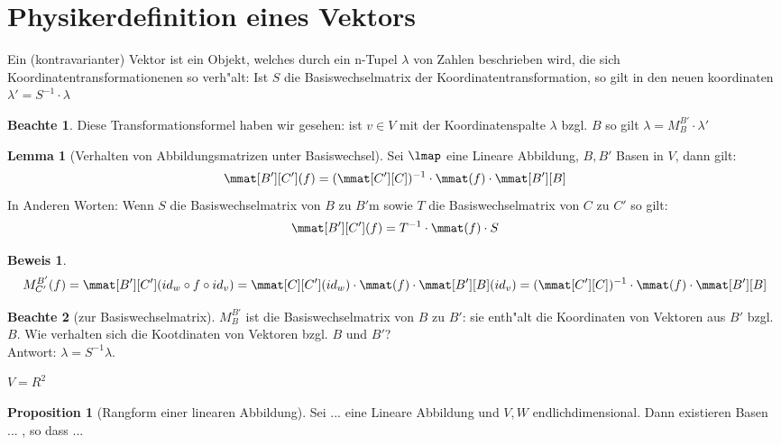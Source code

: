 \documentclass[oneside,fontsize=11pt,paper=a4,BCOR=0mm,DIV=12,automark,headsepline]{scrbook}
\theoremstyle{remark}
\theoremstyle{definition}
\newtheorem*{notte}{Beachte}
\newtheorem*{proposition}{Proposition}
\newtheorem{lemma}{Lemma}[section]
\theoremstyle{definition}
\newtheorem*{prof}{Beweis}
\theoremstyle{remark}
\begin{document}
\section{Physikerdefinition eines Vektors}
\label{sec:phyv}

Ein (kontravarianter) Vektor ist ein Objekt, welches durch ein n-Tupel \(\lambda\)
von Zahlen beschrieben wird, die sich Koordinatentransformationenen so
verh"alt: Ist $S$ die Basiswechselmatrix der Koordinatentransformation, so gilt
in den neuen koordinaten $\lambda'=S^{-1}\cdot\lambda$

\begin{notte}
  Diese Transformationsformel haben wir gesehen: ist $v\in V$ mit der
  Koordinatenspalte $\lambda$ bzgl. $B$ so gilt
  $\lambda=M^{B'}_{B}\cdot \lambda ' $
\end{notte}

\begin{lemma}[Verhalten von Abbildungsmatrizen unter Basiswechsel]
  Sei $\lmap$ eine Lineare Abbildung, $B,B'$ Basen in $V$, dann gilt:
  \[
    \mmat[B'][C'](f)=(\mmat[C'][C])^{-1} \cdot \mmat(f) \cdot \mmat[B'][B]
  \] In Anderen Worten: Wenn $S$ die Basiswechselmatrix von $B$ zu $B'$m sowie $T$ die 
  Basiswechselmatrix von $C$ zu $C'$ so gilt:
   \[
  \mmat[B'][C'](f)=T^{-1}\cdot \mmat(f) \cdot S
  \]
\end{lemma}

\begin{prof}
  \[M^{B'}_{C'}(f)=\mmat[B'][C'](id_w \circ f \circ id_v)=\mmat[C][C'](id_w) \cdot \mmat(f) \cdot \mmat[B'][B](id_v)=(\mmat[C'][C])^{-1} \cdot \mmat(f) \cdot \mmat[B'][B]\]
\end{prof}

\begin{notte}[zur Basiswechselmatrix]
  $ M^{B'}_{B}$ ist die Basiswechselmatrix von $B$ zu $B'$: sie enth"alt die
  Koordinaten von Vektoren aus $B'$ bzgl. $B$. Wie verhalten sich die
  Kootdinaten von Vektoren bzgl. $B$ und $B'$?\\
   Antwort: $\lambda = S^{-1}\lambda$.
\end{notte}

\begin{exa}
  $V=R^{2}$
\end{exa}

\begin{proposition}[Rangform einer linearen Abbildung]
  Sei ... eine Lineare Abbildung und $V,W$ endlichdimensional. Dann existieren
  Basen ... , so dass ...
\end{proposition}
\end{document}
